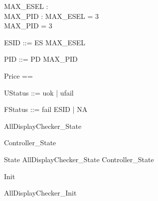 \documentclass{article}
\begin{document}

\begin{axdef}
	MAX\_ESEL : \nat \\
 MAX\_PID : \nat 
\where
 MAX\_ESEL = 3 \\
 MAX\_PID = 3
\end{axdef}

\begin{zed}
	ESID ::= ES  \upto MAX\_ESEL \rdata
\end{zed}

\begin{zed}
	PID ::= PD  \upto MAX\_PID \rdata
\end{zed}

\begin{zed}
	Price == \nat
\end{zed}

\begin{zed}
	UStatus ::= uok | ufail
\end{zed}

\begin{zed}
	FStatus ::= fail \ldata ESID \rdata | NA
\end{zed}

\begin{zed}
	AllDisplayChecker\_State 
\end{zed}

\begin{zed}
	Controller\_State 
\end{zed}

\begin{zed}
	State  AllDisplayChecker\_State \land Controller\_State
\end{zed}

\begin{zed}
	Init 
\end{zed}

\begin{zed}
	AllDisplayChecker\_Init 
\end{zed}
\end{document}
